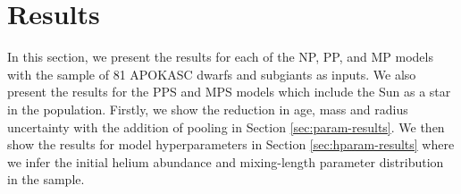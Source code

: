 \documentclass[a4paper,fleqn,usenatbib]{mnras}
\begin{document}
\section{Results}\label{sec:res}






In this section, we present the results for each of the NP, PP, and MP models with the sample of 81 APOKASC dwarfs and subgiants as inputs. We also present the results for the PPS and MPS models which include the Sun as a star in the population. Firstly, we show the reduction in age, mass and radius uncertainty with the addition of pooling in Section \ref{sec:param-results}. We then show the results for model hyperparameters in Section \ref{sec:hparam-results} where we infer the initial helium abundance and mixing-length parameter distribution in the sample.
\end{document}
